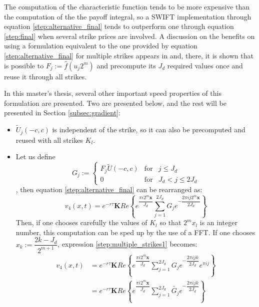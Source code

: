 \documentclass[12,twoside]{mammeTFM}
\theoremstyle{definition}
\theoremstyle{remark}
\begin{document}
The computation of the characteristic function tends to be more expensive than the computation of the the payoff integral, so a SWIFT implementation through equation \ref{step:alternative_final} tends to outperform one through equation \ref{step:final} when several strike prices are involved. A discussion on the benefits on using a formulation equivalent to the one provided by equation \ref{step:alternative_final} for multiple strikes appears in \cite{Ortiz-Gracia2016} and, there, it is shown that is possible to $F_j := \hat{f}(u_j 2^m)$ and precompute its $J_d$ required values once and reuse it through all strikes.

In this master's thesis, several other important speed properties of this formulation are presented. Two are presented below, and the rest will be presented in Section \ref{subsec:gradient}:
\begin{itemize}
\item $\tilde{U}_j(-c, c)$ is independent of the strike, so it can also be precomputed and reused with all strikes $K_l$.
\item Let us define
\begin{equation} 
G_j := \left\{ \begin{array}{rcl} F_j \tilde{U}(-c, c) & \mbox{for} & j \leq J_d \\
 0 & \mbox{for} & J_d < j \leq 2 J_d \end{array}\right.
\end{equation}
, then equation \ref{step:alternative_final} can be rearranged as:
\begin{equation}\label{step:multiple_strikes1}
v_4(x, t) = e^{-r\tau}\boldsymbol{K} Re \left\{e^{\dfrac{\pi i 2^m \boldsymbol{x}}{J_d}} \sum_{j=1}^{2J_d} G_j e^{- \dfrac{2\pi i j 2^m \boldsymbol{x}}{2J_d}} \right\}
\end{equation}
Then, if one chooses carefully the values of $K_l$ so that $2^m x_l$ is an integer number, this computation can be sped up by the use of a FFT. If one chooses $x_k := \dfrac{2k - J_d}{2^{m+1}}$, expression \ref{step:multiple_strikes1} becomes:
\begin{equation}\label{step:multiple_strikes2}
\begin{aligned}
v_4(x, t) & = e^{-r\tau}\boldsymbol{K} Re \left\{e^{\dfrac{\pi i 2^m \boldsymbol{x}}{J_d}} \sum_{j=1}^{2J_d} G_j e^{- \dfrac{2\pi i j k}{2J_d}} e^{\pi i j}  \right\} \\
& = e^{-r\tau}\boldsymbol{K} Re \left\{e^{\dfrac{\pi i 2^m \boldsymbol{x}}{J_d}} \sum_{j=1}^{2J_d} \tilde{G_j} e^{- \dfrac{2\pi i j k}{2J_d}} \right\} \\

\end{aligned}
\end{equation}
\end{itemize}
\end{document}
